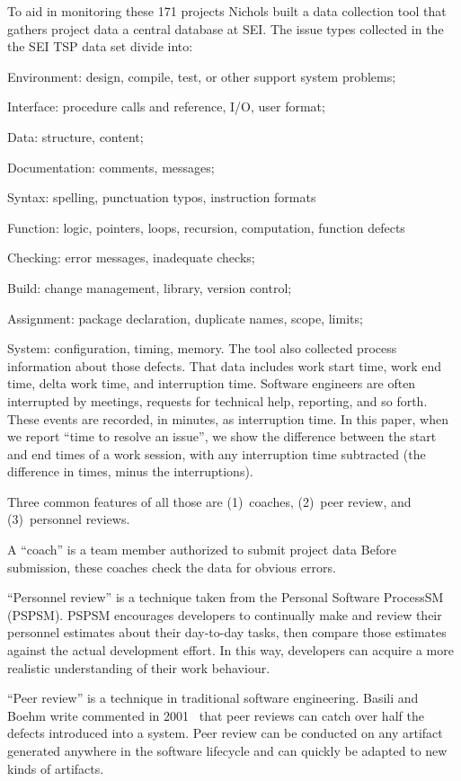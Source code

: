 To aid in monitoring these 171 projects  Nichols  built a
data collection tool that gathers project data a central database at SEI. 
The issue types collected in the the SEI TSP data set divide into:
\be 
\item Environment: design, compile, test, or other support system problems;
\item Interface: procedure calls and reference, I/O, user format;
\item Data: structure, content; 
\item Documentation: comments, messages;
\item Syntax: spelling, punctuation typos, instruction formats
\item Function: logic, pointers, loops, recursion, computation, function defects  
\item Checking: error messages, inadequate checks;
\item Build: change management, library, version control;
\item Assignment: package
declaration, duplicate names, scope, limits;
\item System: configuration, timing, memory.
\ee
The tool also collected process information about those defects.
That data includes  work start time, work end time, delta
work time, and interruption time. Software engineers are often
interrupted by meetings, requests for technical help, reporting, and
so forth. These events are recorded, in minutes, as interruption
time. In this paper, when we report ``time to resolve an
issue'', we show the difference between the start and end times
of a work session, with any interruption time subtracted (the
difference in times, minus the interruptions).  

Three common features of all those  are (1)~coaches,
(2)~peer review, and  (3)~personnel reviews.
 
A ``coach'' is a team member  authorized to submit project data
Before submission,
these coaches check the data for obvious errors.

``Personnel review'' is a technique taken  from the Personal Software
ProcessSM (PSPSM). PSPSM encourages developers to continually make and review their personnel estimates
about their day-to-day tasks, then compare those estimates against the actual development effort.
In this way, developers can acquire a more realistic understanding of their work behaviour.

 
``Peer review'' is a  technique in
traditional software engineering.
 Basili and Boehm write  commented in 2001~\cite{boehm01} 
that peer reviews can catch over half the defects introduced into a system.
Peer review can be conducted on any artifact generated anywhere in the software
lifecycle and can quickly be adapted to new kinds of artifacts.



